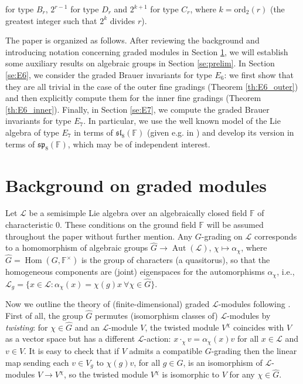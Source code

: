 \documentclass[a4paper,reqno]{amsart}
\theoremstyle{definition}
\numberwithin{theorem}{section}
\numberwithin{equation}{section}
\begin{document}
for type $B_r$, $2^{r-1}$ for type $D_r$ and $2^{k+1}$ for type $C_r$, where $k=\mathrm{ord}_2(r)$ (the greatest integer such that $2^k$ divides $r$).

The paper is organized as follows. After reviewing the background and introducing notation concerning graded modules in Section \ref{se:graded_modules}, we will establish some auxiliary results on algebraic groups in Section \ref{se:prelim}. In Section \ref{se:E6}, we consider the graded Brauer invariants for type $E_6$: we first show that they are all trivial in the case of the outer fine gradings (Theorem \ref{th:E6_outer}) and then explicitly compute them for the inner fine gradings (Theorem \ref{th:E6_inner}). Finally, in Section \ref{se:E7}, we compute the graded Brauer invariants for type $E_7$. In particular, we use the well known model of the Lie algebra of type $E_7$ in terms of ${\mathfrak{sl}}_8({\mathbb{F}})$ (given e.g. in \cite{Adams}) and develop its version in terms of ${\mathfrak{sp}}_8({\mathbb{F}})$, which may be of independent interest.

\section{Background on graded modules}\label{se:graded_modules}

Let ${\mathcal{L}}$ be a semisimple Lie algebra over an algebraically closed field ${\mathbb{F}}$ of characteristic $0$. These conditions on the ground field ${\mathbb{F}}$ will be assumed throughout the paper without further mention. Any $G$-grading on ${\mathcal{L}}$ corresponds to a homomorphism of algebraic groups ${\widehat{{G}}}\rightarrow \operatorname{\mathrm{Aut}}({\mathcal{L}})$, $\chi\mapsto \alpha_\chi$, where ${\widehat{{G}}}=\operatorname{\mathrm{Hom}}(G,{\mathbb{F}}^\times)$ is the group of characters (a quasitorus), so that the homogeneous components are (joint) eigenspaces for the automorphisms $\alpha_\chi$, i.e., ${\mathcal{L}}_g=\{ x\in {\mathcal{L}}:\alpha_\chi(x)=\chi(g)x\ \forall \chi\in {\widehat{{G}}}\}$. 

Now we outline the theory of (finite-dimensional) graded ${\mathcal{L}}$-modules following \cite{EK_Israel}. First of all, the group ${\widehat{{G}}}$ permutes (isomorphism classes of) ${\mathcal{L}}$-modules by \emph{twisting}: for $\chi\in{\widehat{{G}}}$ and an ${\mathcal{L}}$-module $V$, the twisted module $V^\chi$ coincides with $V$ as a vector space but has a different ${\mathcal{L}}$-action: $x\cdot_\chi v=\alpha_\chi(x)v$ for all $x\in{\mathcal{L}}$ and $v\in V$. It is easy to check that if $V$ admits a compatible $G$-grading then the linear map sending each $v\in V_g$ to $\chi(g)v$, for all $g\in G$, is an isomorphism of ${\mathcal{L}}$-modules $V\to V^\chi$, so the twisted module $V^\chi$ is isomorphic to $V$ for any $\chi\in{\widehat{{G}}}$.
\end{document}
